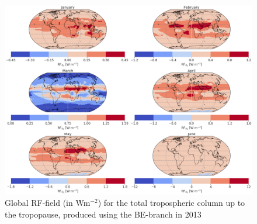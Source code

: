 \begin{figure}[ht]
    \centering
    \includegraphics[width = \linewidth]{Chapter6_Results/images/RF/RF_USE/Appendix/BE_RF_global_2013.png}
    \caption{Global RF-field (in Wm$^{-2}$) for the total tropospheric column up to the tropopause, produced using the BE-branch in 2013}
    \label{fig:BE_RF_global_2013}
\end{figure}